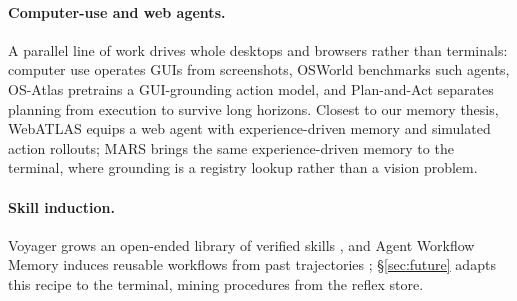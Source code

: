 \paragraph{Computer-use and web agents.}
A parallel line of work drives whole desktops and browsers rather than terminals:
computer use \citep{anthropic2024computeruse} operates GUIs from screenshots, OSWorld
\citep{xie2024osworld} benchmarks such agents, OS-Atlas \citep{wu2025osatlas}
pretrains a GUI-grounding action model, and Plan-and-Act \citep{erdogan2025planandact}
separates planning from execution to survive long horizons. Closest to our memory
thesis, WebATLAS \citep{cheng2025webatlas} equips a web agent with experience-driven
memory and simulated action rollouts; MARS brings the same experience-driven memory
to the terminal, where grounding is a registry lookup rather than a vision problem.

\paragraph{Skill induction.}
Voyager grows an open-ended library of verified skills \citep{wang2023voyager}, and
Agent Workflow Memory induces reusable workflows from past trajectories
\citep{wang2024awm}; \S\ref{sec:future} adapts this recipe to the terminal, mining
procedures from the reflex store.

